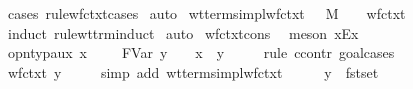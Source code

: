 \begin{isabellebody}
%
\isadelimproof
%
\endisadelimproof
%
\isatagproof
{}\isamarkupfalse%
\ {\isacharparenleft}cases\ rule{\isacharcolon}wf{\isacharunderscore}ctxt{\isachardot}cases{\isacharparenright}\isanewline
{}\isamarkupfalse%
\ auto%
\endisatagproof
{\isafoldproof}%
%
\isadelimproof
\isanewline
%
\endisadelimproof
\isanewline
{}\isamarkupfalse%
\ wt{\isacharunderscore}terms{\isacharunderscore}impl{\isacharunderscore}wf{\isacharunderscore}ctxt{\isacharcolon}\ {\isachardoublequoteopen}{\isasymGamma}\ {\isasymturnstile}\ M\ {\isacharcolon}\ {\isasymsigma}\ {\isasymLongrightarrow}\ wf{\isacharunderscore}ctxt\ {\isasymGamma}{\isachardoublequoteclose}\isanewline
%
\isadelimproof
%
\endisadelimproof
%
\isatagproof
{}\isamarkupfalse%
\ {\isacharparenleft}induct\ rule{\isacharcolon}wt{\isacharunderscore}trm{\isachardot}induct{\isacharparenright}\isanewline
{}\isamarkupfalse%
\ auto\isanewline
{}\isamarkupfalse%
\ wf{\isacharunderscore}ctxt{\isacharunderscore}cons\ \isamarkupfalse%
\ {\isacharparenleft}meson\ x{\isacharunderscore}Ex{\isacharparenright}%
\endisatagproof
{\isafoldproof}%
%
\isadelimproof
\isanewline
%
\endisadelimproof
\isanewline
{}\isamarkupfalse%
\ opn{\isacharunderscore}typ{\isacharunderscore}aux{\isacharcolon}\ {\isachardoublequoteopen}{\isacharparenleft}x{\isacharcomma}\ {\isasymtau}{\isacharparenright}\ {\isacharhash}\ {\isasymGamma}\ {\isasymturnstile}\ FVar\ y\ {\isacharcolon}\ {\isasymsigma}\ {\isasymLongrightarrow}\ x\ {\isacharequal}\ y\ {\isasymLongrightarrow}\ {\isasymtau}\ {\isacharequal}\ {\isasymsigma}{\isachardoublequoteclose}\isanewline
%
\isadelimproof
%
\endisadelimproof
%
\isatagproof
{}\isamarkupfalse%
\ {\isacharparenleft}rule\ ccontr{\isacharcomma}\ goal{\isacharunderscore}cases{\isacharparenright}\isanewline
{}\isamarkupfalse%
\ {}\ \isanewline
\ \ \isamarkupfalse%
\ \isamarkupfalse%
\ {\isachardoublequoteopen}wf{\isacharunderscore}ctxt\ {\isacharparenleft}{\isacharparenleft}y{\isacharcomma}\ {\isasymtau}{\isacharparenright}\ {\isacharhash}\ {\isasymGamma}{\isacharparenright}{\isachardoublequoteclose}\ \isamarkupfalse%
\ {\isacharparenleft}simp\ add{\isacharcolon}\ wt{\isacharunderscore}terms{\isacharunderscore}impl{\isacharunderscore}wf{\isacharunderscore}ctxt{\isacharparenright}\isanewline
\ \ \isamarkupfalse%
\ \isamarkupfalse%
\ {\isachardoublequoteopen}y\ {\isasymnotin}\ fst{\isacharbackquote}set\ {\isasymGamma}{\isachardoublequoteclose}\ \isamarkupfalse%

\end{isabellebody}
